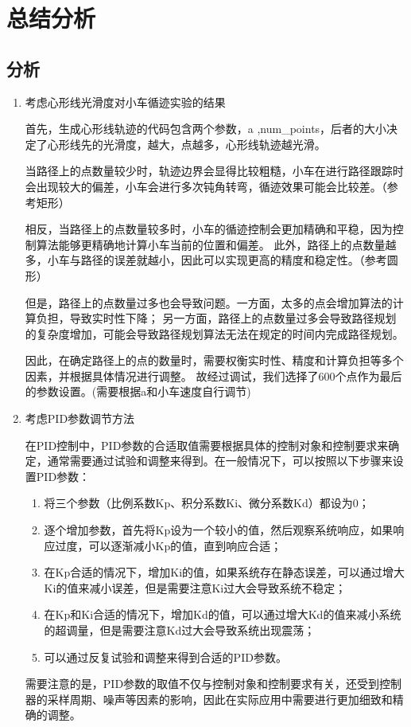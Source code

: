 \documentclass{xjtureport}
\begin{document}
\section{总结分析}
\subsection{分析}
\begin{enumerate}
    \item 考虑心形线光滑度对小车循迹实验的结果
    
    首先，生成心形线轨迹的代码包含两个参数，a ,num\_points，后者的大小决定了心形线先的光滑度，越大，点越多，心形线轨迹越光滑。
    
    当路径上的点数量较少时，轨迹边界会显得比较粗糙，小车在进行路径跟踪时会出现较大的偏差，小车会进行多次钝角转弯，循迹效果可能会比较差。（参考矩形）

    相反，当路径上的点数量较多时，小车的循迹控制会更加精确和平稳，因为控制算法能够更精确地计算小车当前的位置和偏差。
    此外，路径上的点数量越多，小车与路径的误差就越小，因此可以实现更高的精度和稳定性。（参考圆形）

    但是，路径上的点数量过多也会导致问题。一方面，太多的点会增加算法的计算负担，导致实时性下降；
    另一方面，路径上的点数量过多会导致路径规划的复杂度增加，可能会导致路径规划算法无法在规定的时间内完成路径规划。

    因此，在确定路径上的点的数量时，需要权衡实时性、精度和计算负担等多个因素，并根据具体情况进行调整。
    故经过调试，我们选择了600个点作为最后的参数设置。(需要根据a和小车速度自行调节)

    \item 考虑PID参数调节方法
    
    在PID控制中，PID参数的合适取值需要根据具体的控制对象和控制要求来确定，通常需要通过试验和调整来得到。在一般情况下，可以按照以下步骤来设置PID参数：
    \begin{enumerate}
        \item 将三个参数（比例系数Kp、积分系数Ki、微分系数Kd）都设为0；
        \item 逐个增加参数，首先将Kp设为一个较小的值，然后观察系统响应，如果响应过度，可以逐渐减小Kp的值，直到响应合适；
        \item 在Kp合适的情况下，增加Ki的值，如果系统存在静态误差，可以通过增大Ki的值来减小误差，但是需要注意Ki过大会导致系统不稳定；
        \item 在Kp和Ki合适的情况下，增加Kd的值，可以通过增大Kd的值来减小系统的超调量，但是需要注意Kd过大会导致系统出现震荡；
        \item 可以通过反复试验和调整来得到合适的PID参数。
    \end{enumerate}
    需要注意的是，PID参数的取值不仅与控制对象和控制要求有关，还受到控制器的采样周期、噪声等因素的影响，因此在实际应用中需要进行更加细致和精确的调整。

\end{enumerate}
\end{document}
